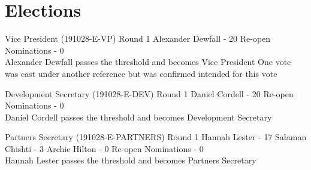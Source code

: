 \documentclass[11pt,hacksoc]{meetingmins}
\begin{document}
\section{Elections}
\begin{items}

  \item Vice President (191028-E-VP)
    \subitem Round 1
      \subsubitem Alexander Dewfall - 20
      \subsubitem Re-open Nominations - 0
      \\
      \subsubitem Alexander Dewfall passes the threshold and becomes Vice President
      \subsubitem One vote was cast under another reference but was confirmed intended for this vote

  \item Development Secretary (191028-E-DEV)
    \subitem Round 1
      \subsubitem Daniel Cordell - 20
      \subsubitem Re-open Nominations - 0
      \\
      \subsubitem Daniel Cordell passes the threshold and becomes Development Secretary

  \item Partners Secretary (191028-E-PARTNERS)
    \subitem Round 1
      \subsubitem Hannah Lester - 17
      \subsubitem Salaman Chishti - 3
      \subsubitem Archie Hilton - 0
      \subsubitem Re-open Nominations - 0
      \\
      \subsubitem Hannah Lester passes the threshold and becomes Partners Secretary
\end{items}
\end{document}
